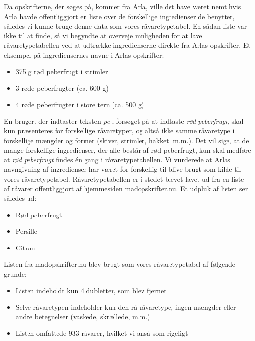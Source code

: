 Da opskrifterne, der søges på, kommer fra Arla, ville det have været nemt hvis Arla havde offentliggjort en liste over de forskellige ingredienser de benytter, således vi kunne bruge denne data som vores råvaretypetabel. En sådan liste var ikke til at finde, så vi begyndte at overveje muligheden for at lave råvaretypetabellen ved at udtrække ingredienserne direkte fra Arlas opskrifter. Et eksempel på ingrediensernes navne i Arlas opskrifter:

\begin{itemize} [noitemsep]
  \item 375 g rød peberfrugt i strimler
  \item 3 røde peberfrugter (ca. 600 g)
  \item 4 røde peberfrugter i store tern (ca. 500 g)
\end{itemize}

En bruger, der indtaster teksten \textit{pe} i forsøget på at indtaste \textit{rød peberfrugt}, skal kun præsenteres for forskellige råvaretyper, og altså ikke samme råvaretype i forskellige mængder og former (skiver, strimler, hakket, m.m.). Det vil sige, at de mange forskellige ingredienser, der alle består af rød peberfrugt, kun skal medføre at \textit{rød peberfrugt} findes én gang i råvaretypetabellen. Vi vurderede at Arlas navngivning af ingredienser har været for forskellig til blive brugt som kilde til vores råvaretypetabel. Råvaretypetabellen er i stedet blevet lavet ud fra en liste af råvarer offentliggjort af hjemmesiden madopskrifter.nu\cite{ingrediensliste}. Et udpluk af listen ser således ud:

\begin{itemize} [noitemsep]
  \item Rød peberfrugt
  \item Persille
  \item Citron
\end{itemize}

Listen fra madopskrifter.nu blev brugt som vores råvaretypetabel af følgende grunde:

\begin{itemize} [noitemsep]
  \item Listen indeholdt kun 4 dubletter, som blev fjernet
  \item Selve råvaretypen indeholder kun den rå råvaretype, ingen mængder eller andre betegnelser (vaskede, skrællede, m.m.)
  \item Listen omfattede 933 råvarer, hvilket vi anså som rigeligt
\end{itemize}

